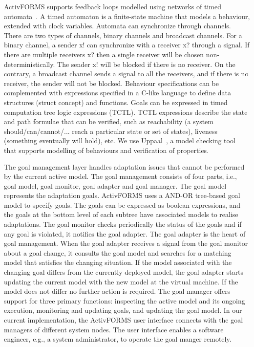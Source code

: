 ActivFORMS supports feedback loops modelled using networks of timed automata~\cite{Alur1990}. A timed automaton is a finite-state machine that models a behaviour, extended with clock variables. Automata can synchronize through channels. There are two types of channels, binary channels and broadcast channels. For a binary channel, a sender x! can synchronize with a receiver x? through a signal. If there are multiple receivers x? then a single receiver will be chosen non-deterministically. The sender x! will be blocked if there is no receiver. On the contrary, a broadcast channel sends a signal to all the receivers, and if there is no receiver, the sender will not be blocked. Behaviour specifications can be complemented with expressions specified in a C-like language to define data structures (struct concept) and functions. Goals can be expressed in timed computation tree logic expressions (TCTL). TCTL expressions describe the state and path formulae that can be verified, such as reachability (a system should/can/cannot/... reach a particular state or set of states), liveness (something eventually will hold), etc. We use Uppaal~\cite{Behrmann2004}, a model checking tool that supports modelling of behaviours and verification of properties.

The goal management layer handles adaptation issues that cannot be performed by the current active model. The goal management consists of four parts, i.e., goal model, goal monitor, goal adapter and goal manager. The goal model represents the adaptation goals. ActivFORMS uses a AND-OR tree-based goal model to specify goals. The goals can be expressed as boolean expressions, and the goals at the bottom level of each subtree have associated models to realise adaptations. The goal monitor checks periodically the status of the goals and if any goal is violated, it notifies the goal adapter. The goal adapter is the heart of goal management. When the goal adapter receives a signal  from the goal monitor about a goal change, it consults the goal model and searches for a matching model that satisfies the changing situation. If the model associated with the changing goal differs from the currently deployed model, the goal adapter starts updating the current model with the new model at the virtual machine. If the model does not differ no further action is required. The goal manager offers support for three primary functions: inspecting the active model and its ongoing execution, monitoring and updating goals, and updating the goal model. In our current implementation, the ActivFORMS user interface connects with the goal managers of different system nodes. The user interface enables a software engineer, e.g., a system administrator, to operate the goal manger remotely.
